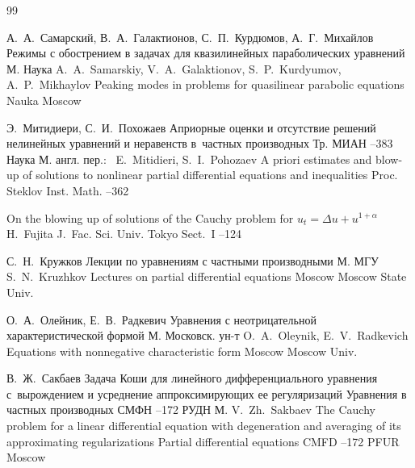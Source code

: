 

\begin{thebibliography}{99}


\by А.~А.~Самарский, В.~А.~Галактионов, С.~П.~Курдюмов, А.~Г.~Михайлов
\book Режимы с обострением в задачах для квазилинейных параболических уравнений
\publaddr М.
\publ Наука
\misctransl
\by A.~A.~Samarskiy, V.~A.~Galaktionov, S.~P.~Kurdyumov, A.~P.~Mikhaylov 
\book Peaking modes in problems for quasilinear parabolic equations
\publ Nauka
\publaddr Moscow



\by Э.~Митидиери, С.~И.~Похожаев
\paper Априорные оценки и отсутствие решений нелинейных уравнений и неравенств в~частных производных
\serial Тр. МИАН
--383
\publ Наука
\publaddr М.
\transl англ. пер.:~
\by E.~Mitidieri, S.~I.~Pohozaev
A priori estimates and blow-up of solutions to nonlinear partial differential equations and inequalities
\jour Proc. Steklov Inst. Math.
--362


\paper On the blowing up of solutions of  the Cauchy problem for $u_t=\Delta u+u^{1+\alpha }$
\by H.~Fujita
\jour J.~Fac. Sci. Univ. Tokyo Sect.~I
--124




\by С.~Н.~Кружков
\book Лекции по уравнениям с частными производными
\publaddr М.
\publ МГУ
\misctransl
\by S.~N.~Kruzhkov 
\book Lectures on partial differential equations
\publaddr Moscow
\publ Moscow State Univ.



\by О.~А.~Олейник, Е.~В.~Радкевич
\book Уравнения с неотрицательной характеристической формой
\publaddr М.
\publ Московск. ун-т
\misctransl
\by O.~A.~Oleynik, E.~V.~Radkevich
\book Equations with nonnegative characteristic form
\publaddr Moscow
\publ Moscow Univ.




\by В.~Ж.~Сакбаев
\paper Задача Коши для линейного дифференциального уравнения с~вырождением и усреднение аппроксимирующих ее регуляризаций
\inbook Уравнения в частных производных
\serial СМФН
--172
\publ РУДН
\publaddr М.
\misctransl
\by V.~Zh.~Sakbaev
\paper The Cauchy problem for a linear differential equation with degeneration and averaging of its approximating  regularizations
\inbook Partial differential equations
\serial CMFD
--172
\publ PFUR
\publaddr Moscow




\end{thebibliography}

